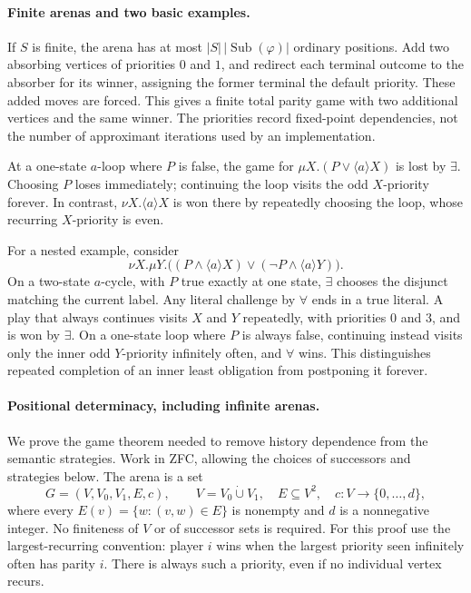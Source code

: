 \paragraph{Finite arenas and two basic examples.}
If \(S\) is finite, the arena has at most
\(|S|\,|\operatorname{Sub}(\varphi)|\)
ordinary positions. Add two absorbing
vertices of priorities \(0\) and \(1\),
and redirect each terminal outcome to
the absorber for its winner, assigning
the former terminal the default priority.
These added moves are forced. This gives
a finite total parity game with two
additional vertices and the same winner.
The priorities record fixed-point
dependencies, not the number of
approximant iterations used by an
implementation.

At a one-state \(a\)-loop where \(P\)
is false, the game for
\(\mu X.(P\lor\langle a\rangle X)\)
is lost by \(\exists\). Choosing \(P\)
loses immediately; continuing the loop
visits the odd \(X\)-priority forever.
In contrast, \(\nu X.\langle a\rangle X\)
is won there by repeatedly choosing the
loop, whose recurring \(X\)-priority is
even.

For a nested example, consider
\[
 \nu X.\mu Y.\bigl(
     (P\land\langle a\rangle X)
       \lor(\neg P\land\langle a\rangle Y)\bigr).
\]
On a two-state \(a\)-cycle, with \(P\)
true exactly at one state, \(\exists\)
chooses the disjunct matching the current
label. Any literal challenge by \(\forall\)
ends in a true literal. A play that always
continues visits \(X\) and \(Y\) repeatedly,
with priorities \(0\) and \(3\), and is
won by \(\exists\). On a one-state loop
where \(P\) is always false, continuing
instead visits only the inner odd
\(Y\)-priority infinitely often, and
\(\forall\) wins. This distinguishes
repeated completion of an inner least
obligation from postponing it forever.

\paragraph{Positional determinacy, including infinite arenas.}
\label{sec:p09-parity-positional-proof}
We prove the game theorem needed to remove
history dependence from the semantic strategies.
Work in ZFC, allowing the choices of successors
and strategies below. The arena is a set
\[
 G=(V,V_0,V_1,E,c),\qquad
 V=V_0\mathbin{\dot\cup}V_1,\quad
 E\subseteq V^2,\quad c:V\to\{0,\ldots,d\},
\]
where every \(E(v)=\{w:(v,w)\in E\}\) is nonempty
and \(d\) is a nonnegative integer. No finiteness
of \(V\) or of successor sets is required.
For this proof use the largest-recurring
convention: player \(i\) wins when the largest
priority seen infinitely often has parity \(i\).
There is always such a priority, even if no
individual vertex recurs.

